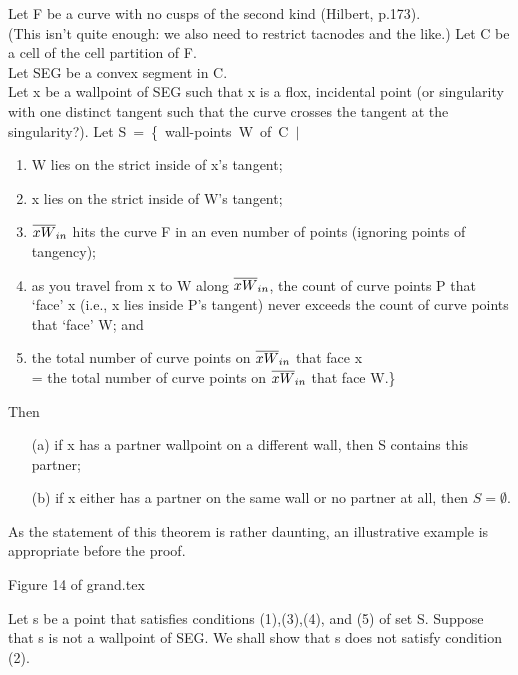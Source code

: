 \begin{theorem}
\label{newgrand}
Let F be a curve with no cusps of the second kind (Hilbert, p.173).\\
(This isn't quite enough: we also need to restrict tacnodes and the like.)
Let C be a cell of the cell partition of F.\\
Let SEG be a convex segment in C.\\
Let x be a wallpoint of SEG such that x is a flox, incidental point (or 
singularity with one distinct tangent such that
the curve crosses the tangent at the singularity?).
Let \mbox{S = \{ wall-points W of C $\mid$ }
\begin{enumerate}
	\item W lies on the strict inside of x's tangent;
        \item x lies on the strict inside of W's tangent;
	\item $\mbox{$\overline{xW}$}_{in}$ hits the curve F in an even number of points (ignoring
points of tangency); 
	\item as you travel from x to W along $\mbox{$\overline{xW}$}_{in}$,
the count of curve points P that `face' x (i.e., x lies inside P's
tangent) never exceeds the count of curve points that `face' W; and
        \item the total number of curve points on $\mbox{$\overline{xW}$}_{in}$ that face x\\
= the total number of curve points on $\mbox{$\overline{xW}$}_{in}$ that face W.\}
\end{enumerate}
Then
\begin{enumerate}
        \item[(a)] if x has a partner wallpoint on a 
different wall, then S contains this partner;
        \item[(b)] if x either has a partner on the 
same wall or no partner at all, then $S=\emptyset$.
\end{enumerate}
\end{theorem}
As the statement of this theorem is rather daunting, 
an illustrative example is appropriate before the proof.
\begin{center}
Figure 14 of grand.tex
\end{center}
\proof
Let s be a point that satisfies conditions (1),(3),(4), and (5) of set S.
Suppose that s is not a wallpoint of SEG.
We shall show that s does not satisfy condition (2).
